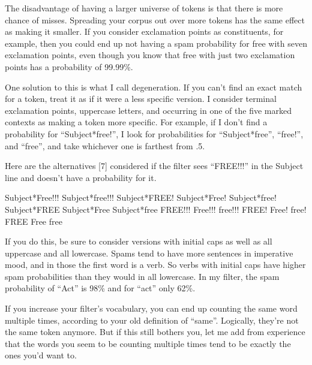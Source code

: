 The
                  disadvantage of having a larger universe of tokens is that
                  there is more chance of misses. Spreading your corpus out over
                  more tokens has the same effect as making it smaller. If you
                  consider exclamation points as constituents, for example, then
                  you could end up not having a spam probability for free with
                  seven exclamation points, even though you know that free with
                  just two exclamation points has a probability of 99.99\%.

One
                  solution to this is what I call degeneration. If you can't
                  find an exact match for a token, treat it as if it were a less
                  specific version. I consider terminal exclamation points,
                  uppercase letters, and occurring in one of the five marked
                  contexts as making a token more specific. For example, if I
                  don't find a probability for ``Subject*free!'', I look for
                  probabilities for ``Subject*free'', ``free!'', and ``free'',
                  and take whichever one is farthest from .5.

Here
                  are the alternatives [7] considered if the filter sees
                  ``FREE!!!'' in the Subject line and doesn't have a probability
                  for it.


                    Subject*Free!!!
Subject*free!!!
Subject*FREE!
Subject*Free!
Subject*free!
Subject*FREE
Subject*Free
Subject*free
FREE!!!
Free!!!
free!!!
FREE!
Free!
free!
FREE
Free
free              

                  
                  If you do this, be sure to consider versions with initial caps
                  as well as all uppercase and all lowercase. Spams tend to have
                  more sentences in imperative mood, and in those the first word
                  is a verb. So verbs with initial caps have higher spam
                  probabilities than they would in all lowercase. In my filter,
                  the spam probability of ``Act'' is 98\% and for ``act'' only
                  62\%.

If you increase your filter's vocabulary, you
                  can end up counting the same word multiple times, according to
                  your old definition of ``same''. Logically, they're not the
                  same token anymore. But if this still bothers you, let me add
                  from experience that the words you seem to be counting
                  multiple times tend to be exactly the ones you'd want to.


